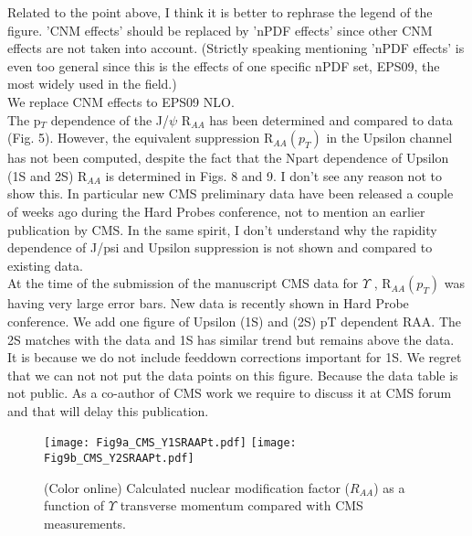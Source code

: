 \documentclass[aps,prc,preprint,superscriptaddress,showpacs,showkeys]{revtex4-1}
\begin{document}
{\color{red}
Related to the point above, I think it is better to rephrase the
legend of the figure. 'CNM effects' should be replaced by 'nPDF
effects' since other CNM effects are not taken into account. (Strictly
speaking mentioning 'nPDF effects' is even too general since this is
the effects of one specific nPDF set, EPS09, the most widely used in
the field.)
}\\


{ \color{black} 
We replace CNM effects to EPS09 NLO.
}\\


{\color{red}
The p$_T$ dependence of the J/$\psi$ R$_{AA}$ has been determined and compared
to data (Fig. 5). However, the equivalent suppression R$_{AA}(p_T)$ in the
Upsilon channel has not been computed, despite the fact that the Npart
dependence of Upsilon (1S and 2S) R$_{AA}$ is determined in Figs. 8 and 9.
I don't see any reason not to show this. In particular new CMS
preliminary data have been released a couple of weeks ago during the
Hard Probes conference, not to mention an earlier publication by CMS.
In the same spirit, I don't understand why the rapidity dependence of
J/psi and Upsilon suppression is not shown and compared to existing
data.
}\\


{ \color{black} 
  At the time of the submission of the manuscript CMS data for $\Upsilon$ , R$_{AA}(p_T)$
was having very large error bars. New data is recently shown in Hard Probe conference.
 We add one figure of Upsilon (1S) and (2S) pT dependent RAA. The 2S matches with the data 
and 1S has similar trend but remains above the data. It is because we do not include feeddown 
corrections important for 1S. We regret that we can not not put the data points on this figure. 
Because the data table is not public. As a co-author of CMS work we require to 
discuss it at CMS forum and that will delay this publication.
}\\




\begin{figure}
\texttt{[image: Fig9a\_CMS\_Y1SRAAPt.pdf]}
\texttt{[image: Fig9b\_CMS\_Y2SRAAPt.pdf]}
\caption{(Color online) Calculated nuclear modification factor ($R_{AA}$) as a function of $\Upsilon$ 
transverse momentum compared with CMS measurements.}
\label{fig:JPsiRaaVsPt}
\end{figure}
\end{document}
